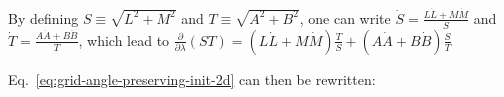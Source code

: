By defining 
$S \equiv \sqrt {{L^2} + {M^2}} $
and 
$T \equiv \sqrt {{A^2} + {B^2}} $,
one can write
$\dot S = \frac{{L\dot L + M\dot M}}{S}$ and 
$\dot T = \frac{{A\dot A + B\dot B}}{T}$, which lead to
$\frac{\partial }{{\partial \lambda }}\left( {ST} \right) = \left( {L\dot L + M\dot M} \right)\frac{T}{S} + \left( {A\dot A + B\dot B} \right)\frac{S}{T}$

Eq.~\ref{eq:grid-angle-preserving-init-2d} can then be rewritten:

